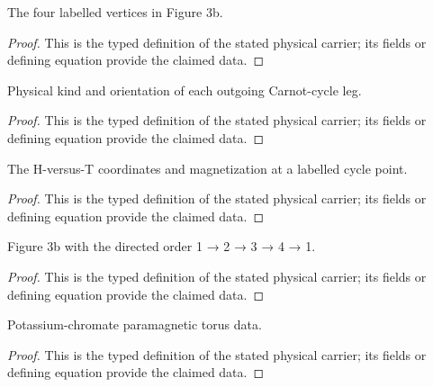 \begin{definition}
  \label{def:physics:IPhO_2026_3_C_3:aux005}
  The four labelled vertices in Figure 3b.
\end{definition}
\begin{proof}
  This is the typed definition of the stated physical carrier; its fields or defining equation provide the claimed data.
\end{proof}

\begin{definition}
  \label{def:physics:IPhO_2026_3_C_3:aux006}
  Physical kind and orientation of each outgoing Carnot-cycle leg.
\end{definition}
\begin{proof}
  This is the typed definition of the stated physical carrier; its fields or defining equation provide the claimed data.
\end{proof}

\begin{definition}
  \label{def:physics:IPhO_2026_3_C_3:aux007}
  The H-versus-T coordinates and magnetization at a labelled cycle point.
\end{definition}
\begin{proof}
  This is the typed definition of the stated physical carrier; its fields or defining equation provide the claimed data.
\end{proof}

\begin{definition}
  \label{def:physics:IPhO_2026_3_C_3:aux008}
  Figure 3b with the directed order 1 → 2 → 3 → 4 → 1.
\end{definition}
\begin{proof}
  This is the typed definition of the stated physical carrier; its fields or defining equation provide the claimed data.
\end{proof}

\begin{definition}
  \label{def:physics:IPhO_2026_3_C_3:aux009}
  Potassium-chromate paramagnetic torus data.
\end{definition}
\begin{proof}
  This is the typed definition of the stated physical carrier; its fields or defining equation provide the claimed data.
\end{proof}

